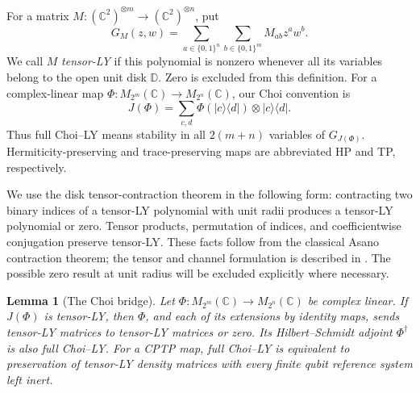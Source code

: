 \documentclass[reqno]{amsart}
\newtheorem{lemma}[theorem]{Lemma}
\theoremstyle{definition}
\theoremstyle{remark}
\newcommand{\C}{\mathbb C}
\newcommand{\D}{\mathbb D}
\begin{document}
For a matrix \(M:(\C^2)^{\otimes m}\to(\C^2)^{\otimes n}\), put
\begin{equation}
 G_M(z,w)=\sum_{a\in\{0,1\}^n}\sum_{b\in\{0,1\}^m}
 M_{ab}z^aw^b.
 \label{stat:matrix-polynomial}
\end{equation}
We call \(M\) \emph{tensor-LY} if this polynomial is nonzero whenever all
its variables belong to the open unit disk \(\D\).  Zero is excluded from
this definition.  For a complex-linear map
\(\Phi:M_{2^m}(\C)\to M_{2^n}(\C)\), our Choi convention is
\begin{equation}
 J(\Phi)=\sum_{c,d}\Phi(|c\rangle\langle d|)
                 \otimes |c\rangle\langle d|.
 \label{stat:choi}
\end{equation}
Thus full Choi--LY means stability in all \(2(m+n)\) variables of
\(G_{J(\Phi)}\).  Hermiticity-preserving and trace-preserving maps are
abbreviated HP and TP, respectively.

We use the disk tensor-contraction theorem in the following form: contracting
two binary indices of a tensor-LY polynomial with unit radii produces a
tensor-LY polynomial or zero.  Tensor products, permutation of indices, and
coefficientwise conjugation preserve tensor-LY.  These facts follow from
the classical Asano contraction theorem; the tensor and channel formulation
is described in \cite[Section~2]{WBG26}.  The possible zero result at unit
radius will be excluded explicitly where necessary.

\begin{lemma}[The Choi bridge]
\label{stat:bridge}
Let \(\Phi:M_{2^m}(\C)\to M_{2^n}(\C)\) be complex linear.
If \(J(\Phi)\) is tensor-LY, then \(\Phi\), and each of its extensions
by identity maps, sends tensor-LY matrices to tensor-LY matrices or zero.
Its Hilbert--Schmidt adjoint \(\Phi^\dagger\) is also full Choi--LY.
For a CPTP map, full Choi--LY is equivalent to preservation of tensor-LY
density matrices with every finite qubit reference system left inert.
\end{lemma}
\end{document}

